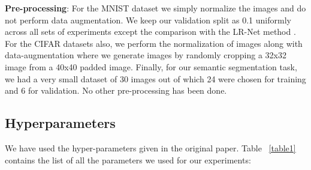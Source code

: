 \textbf{Pre-processing}: For the MNIST dataset we simply normalize the images and do not perform data augmentation. We keep our validation split as 0.1 uniformly across all sets of experiments except the comparison with the LR-Net method \cite{r8}. For the CIFAR datasets also, we perform the normalization of images along with data-augmentation where we generate images by randomly cropping a 32x32 image from a 40x40 padded image. Finally, for our semantic segmentation task, we had a very small dataset of 30 images out of which 24 were chosen for training and 6 for validation. No other pre-processing has been done.

\subsection{Hyperparameters}
We have used the hyper-parameters given in the original paper. Table ~\ref{table1} contains the list of all the parameters we used for our experiments:

